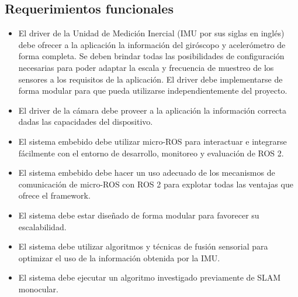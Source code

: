 \documentclass[
11pt, %
codirector, %
]{charter}
\begin{document}





\subsection{Requerimientos funcionales}
\begin{itemize}
	\item El driver de la Unidad de Medición Inercial (IMU por sus siglas en inglés) debe ofrecer a la aplicación la información del giróscopo y acelerómetro de forma completa. Se deben brindar todas las posibilidades de configuración necesarias para poder adaptar la escala y frecuencia de muestreo de los sensores a los requisitos de la aplicación. El driver debe implementarse de forma modular para que pueda utilizarse independientemente del proyecto.
	\item El driver de la cámara debe proveer a la aplicación la información correcta dadas las capacidades del dispositivo.
	\item El sistema embebido debe utilizar micro-ROS para interactuar e integrarse fácilmente con el entorno de desarrollo, monitoreo y evaluación de ROS 2.
	\item El sistema embebido debe hacer un uso adecuado de los mecanismos de comunicación de micro-ROS con ROS 2 para explotar todas las ventajas que ofrece el framework.
	\item El sistema debe estar diseñado de forma modular para favorecer su escalabilidad.
	\item El sistema debe utilizar algoritmos y técnicas de fusión sensorial para optimizar el uso de la información obtenida por la IMU.
	\item El sistema debe ejecutar un algoritmo investigado previamente de SLAM monocular.
\end{itemize}
\end{document}
